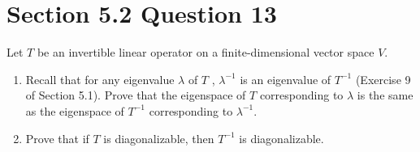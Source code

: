 \documentclass[13pt]{article}
\begin{document}
\newpage
\section*{Section 5.2 Question 13}
Let $T$ be an invertible linear operator on a finite-dimensional vector space $V$.
\begin{enumerate}[label=(\alph*),leftmargin=*]
\item Recall that for any eigenvalue $\lambda$ of $T$ , $\lambda^{-1}$ is an eigenvalue of $T^{-1}$ (Exercise 9 of Section 5.1). Prove that the eigenspace of $T$ corresponding to $\lambda$ is the same as the eigenspace of $T^{-1}$ corresponding to $\lambda^{-1}$.
\item Prove that if $T$ is diagonalizable, then $T^{-1}$ is diagonalizable.
\end{enumerate}
\end{document}
